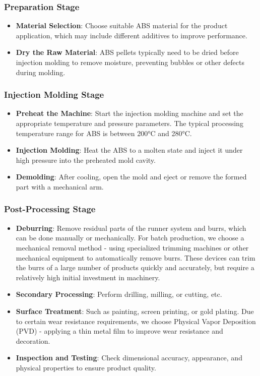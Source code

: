 \documentclass[10pt, a4paper, twocolumn]{article}
\begin{document}
\subsubsection{Preparation Stage}
\begin{itemize}
    \item \textbf{Material Selection}: Choose suitable ABS material for the product application, which may include different additives to improve performance.
    \item \textbf{Dry the Raw Material}: ABS pellets typically need to be dried before injection molding to remove moisture, preventing bubbles or other defects during molding.
\end{itemize}

\subsubsection{Injection Molding Stage}
\begin{itemize}
    \item \textbf{Preheat the Machine}: Start the injection molding machine and set the appropriate temperature and pressure parameters. The typical processing temperature range for ABS is between 200°C and 280°C.
    \item \textbf{Injection Molding}: Heat the ABS to a molten state and inject it under high pressure into the preheated mold cavity.
    \item \textbf{Demolding}: After cooling, open the mold and eject or remove the formed part with a mechanical arm.
\end{itemize}

\subsubsection{Post-Processing Stage}
\begin{itemize}
    \item \textbf{Deburring}: Remove residual parts of the runner system and burrs, which can be done manually or mechanically. For batch production, we choose a mechanical removal method - using specialized trimming machines or other mechanical equipment to automatically remove burrs. These devices can trim the burrs of a large number of products quickly and accurately, but require a relatively high initial investment in machinery.
    \item \textbf{Secondary Processing}: Perform drilling, milling, or cutting, etc.
    \item \textbf{Surface Treatment}: Such as painting, screen printing, or gold plating. Due to certain wear resistance requirements, we choose Physical Vapor Deposition (PVD) - applying a thin metal film to improve wear resistance and decoration.
    \item \textbf{Inspection and Testing}: Check dimensional accuracy, appearance, and physical properties to ensure product quality.
\end{itemize}
\end{document}
